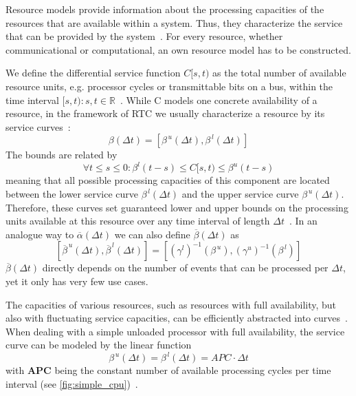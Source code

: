 \label{serviceCurves}

Resource models provide information about the processing capacities of the resources that are available within a system.
Thus, they characterize the service that can be provided by the system~\cite{mar}.
For every resource, whether communicational or computational, an own resource model has to be constructed.


We define the differential service function \(C[s, t)\) as the total number of available resource units, e.g. processor cycles or transmittable bits on a bus, within the time interval \([s, t): s,t \in \mathbb{R}\)~\cite{cho:08}.
While C models one concrete availability of a resource, in the framework of RTC we usually characterize a resource by its service curves~\cite{cho:08}:
\[\beta(\Delta t) = [\beta^{\, u}(\Delta t), \beta^{\, l}(\Delta t)]\]
The bounds are related by \[\forall t \leq s \leq 0: \beta^{l}(t-s) \leq C[s, t) \leq \beta^{u}(t-s)\]
meaning that all possible processing capacities of this component are located between the lower service curve \(\beta^{\, l}(\Delta t)\) and the upper service curve \(\beta^{\, u}(\Delta t)\).
Therefore, these curves set guaranteed lower and upper bounds on the processing units available at this resource over any time interval of length \(\Delta t\)~\cite{moy}.
In an analogue way to \(\overline{\alpha}(\Delta t)\) we can also define \(\overline{\beta}(\Delta t)\) as
\[[\overline{\beta}^{\, u}(\Delta t), \overline{\beta}^{\, l}(\Delta t)] = [(\gamma^{l})^{-1}(\beta^{\, u}), (\gamma^{u})^{-1}(\beta^{\, l})]\]
\(\overline{\beta}(\Delta t)\) directly depends on the number of events that can be processed per \(\Delta t\), yet it only has very few use cases.


The capacities of various resources, such as resources with full availability, but also with fluctuating service capacities, can be efficiently abstracted into curves~\cite{mar}.
When dealing with a simple unloaded processor with full availability, the service curve can be modeled by the linear function
\[\beta^{\, u}(\Delta t) = \beta^{\, l}(\Delta t) = APC \cdot \Delta t\] with \textbf{APC} being the constant number of available processing cycles per time interval (see \autoref{fig:simple_cpu})~\cite{mar}.

